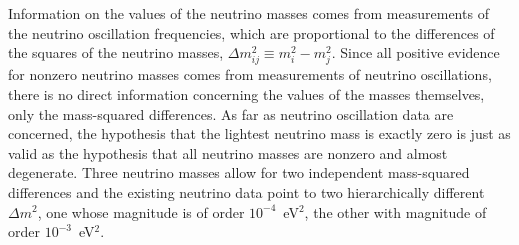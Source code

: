 Information on the values of the neutrino masses comes from measurements of the neutrino oscillation frequencies, which are proportional to the differences of the squares of the neutrino masses, $\Delta m^2_{ij}\equiv m_i^2-m_j^2$. Since all positive evidence for nonzero neutrino masses comes from measurements of neutrino oscillations, there is no direct information concerning the values of the masses themselves, only the mass-squared differences. As far as neutrino oscillation data are concerned, the hypothesis that the lightest neutrino mass is exactly zero is just as valid as the hypothesis that all neutrino masses are nonzero and almost degenerate. Three neutrino masses allow for two independent mass-squared differences and the existing neutrino data point to two hierarchically different $\Delta m^2$, one whose magnitude is of order $10^{-4}$~eV$^2$, the other with magnitude of order $10^{-3}$~eV$^2$. 

